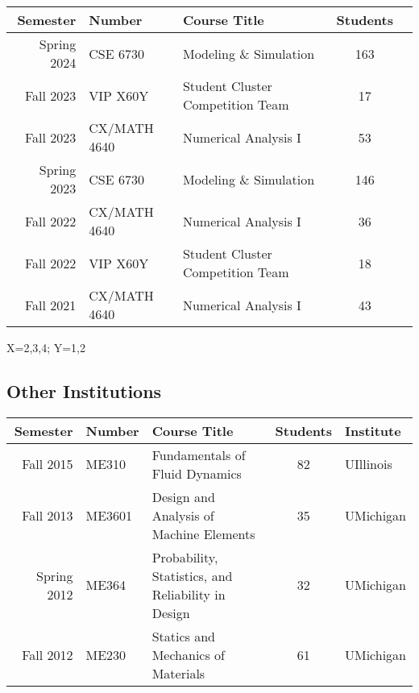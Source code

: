 \begin{center}
    \begin{longtable}{ r l l c c }
        \hline\hline
        \bf Semester&\bf Number     & \bf Course Title                  & \bf Students  \\ \hline
        Spring 2024 & CSE 6730       & Modeling \& Simulation            & 163 \\
        Fall 2023   & VIP X60Y       & Student Cluster Competition Team  & \phantom{1}17 \\
        Fall 2023   & CX/MATH 4640   & Numerical Analysis I              & \phantom{1}53 \\
        Spring 2023 & CSE 6730       & Modeling \& Simulation            & 146           \\
        Fall 2022   & CX/MATH 4640   & Numerical Analysis I              & \phantom{1}36 \\
        Fall 2022   & VIP X60Y       & Student Cluster Competition Team  & \phantom{1}18 \\
        Fall 2021   & CX/MATH 4640   & Numerical Analysis I              & \phantom{1}43 \\
        \hline\hline
    \end{longtable}
    \vspace{-1ex}
    X=2,3,4; Y=1,2
\end{center}

\subsection{Other Institutions}

\begin{center}
    \begin{tabular}{ r l l c l }
        \hline\hline
        \bf Semester  &\bf Number & \bf Course Title & \bf Students & \bf Institute \\
        \hline
        Fall   2015 & ME310  & Fundamentals of Fluid Dynamics & 82 & UIllinois \\
        Fall   2013 & ME3601 & Design and Analysis of Machine Elements & 35 & UMichigan\\
        Spring 2012 & ME364  & Probability, Statistics, and Reliability in Design & 32 & UMichigan \\
        Fall   2012 & ME230  & Statics and Mechanics of Materials & 61 & UMichigan \\
        \hline\hline
    \end{tabular}
\end{center}

